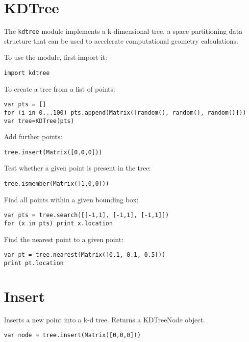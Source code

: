 \hypertarget{kdtree}{%
\section{KDTree}\label{kdtree}}

The \texttt{kdtree} module implements a k-dimensional tree, a space
partitioning data structure that can be used to accelerate computational
geometry calculations.

To use the module, first import it:

\begin{lstlisting}
import kdtree
\end{lstlisting}

To create a tree from a list of points:

\begin{lstlisting}
var pts = []
for (i in 0...100) pts.append(Matrix([random(), random(), random()]))
var tree=KDTree(pts)
\end{lstlisting}

Add further points:

\begin{lstlisting}
tree.insert(Matrix([0,0,0]))
\end{lstlisting}

Test whether a given point is present in the tree:

\begin{lstlisting}
tree.ismember(Matrix([1,0,0]))
\end{lstlisting}

Find all points within a given bounding box:

\begin{lstlisting}
var pts = tree.search([[-1,1], [-1,1], [-1,1]])
for (x in pts) print x.location
\end{lstlisting}

Find the nearest point to a given point:

\begin{lstlisting}
var pt = tree.nearest(Matrix([0.1, 0.1, 0.5]))
print pt.location
\end{lstlisting}

\hypertarget{insert}{%
\section{Insert}\label{insert}}

Inserts a new point into a k-d tree. Returns a KDTreeNode object.

\begin{lstlisting}
var node = tree.insert(Matrix([0,0,0]))
\end{lstlisting}

